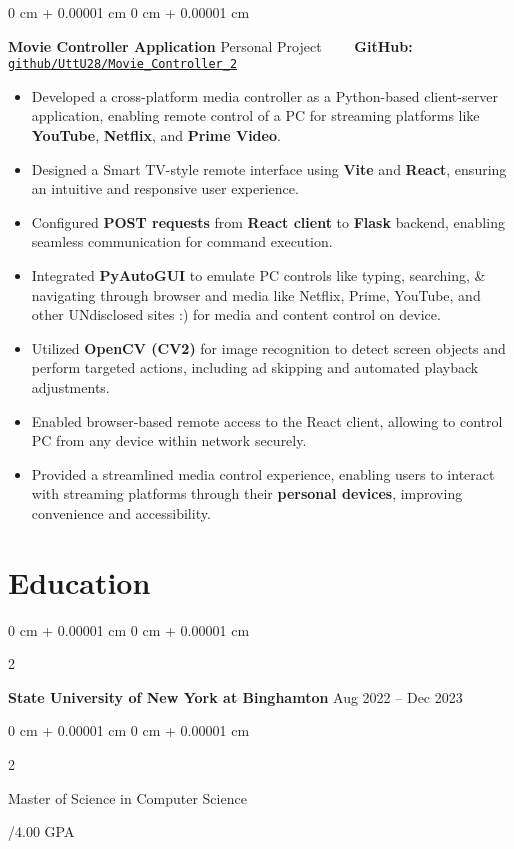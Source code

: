 \documentclass[10pt, letterpaper]{article}
\newenvironment{highlights}{
    \begin{itemize}[
        topsep=0.10 cm,
        parsep=0.10 cm,
        partopsep=0pt,
        itemsep=0pt,
        leftmargin=0 cm + 10pt
    ]
}{
    \end{itemize}
} %
\newenvironment{onecolentry}{
    \begin{adjustwidth}{
        0 cm + 0.00001 cm
    }{
        0 cm + 0.00001 cm
    }
}{
    \end{adjustwidth}
} %
\newenvironment{twocolentry}[2][]{
    \onecolentry
    \def\secondColumn{#2}
    \setcolumnwidth{\fill, 4.5 cm}
    \begin{paracol}{2}
}{
    \switchcolumn \raggedleft \secondColumn
    \end{paracol}
    \endonecolentry
} %
\begin{document}
\begin{onecolentry}
	\textbf{Movie Controller Application} \hfill Personal Project \ \ \ \ \textbf{GitHub:} \href{https://github.com/UttU28/Movie_Controller_2}{\texttt{github/UttU28/Movie\_Controller\_2}}
	\begin{highlights}
		\item Developed a cross-platform media controller as a Python-based client-server application, enabling remote control of a PC for streaming platforms like \textbf{YouTube}, \textbf{Netflix}, and \textbf{Prime Video}.
		\item Designed a Smart TV-style remote interface using \textbf{Vite} and \textbf{React}, ensuring an intuitive and responsive user experience.
		\item Configured \textbf{POST requests} from \textbf{React client} to \textbf{Flask} backend, enabling seamless communication for command execution.
		\item Integrated \textbf{PyAutoGUI} to emulate PC controls like typing, searching, \& navigating through browser and media like Netflix, Prime, YouTube, and other UNdisclosed sites :) for media and content control on device.
		\item Utilized \textbf{OpenCV (CV2)} for image recognition to detect screen objects and perform targeted actions, including ad skipping and automated playback adjustments.
		\item Enabled browser-based remote access to the React client, allowing to control PC from any device within network securely.
		\item Provided a streamlined media control experience, enabling users to interact with streaming platforms through their \textbf{personal devices}, improving convenience and accessibility.
	\end{highlights}
\end{onecolentry}



\section{Education}
\begin{twocolentry}{
		Aug 2022 – Dec 2023
	}
	\textbf{State University of New York at Binghamton}\end{twocolentry}

\begin{twocolentry}{
		3.44/4.00 GPA
	}
	Master of Science in Computer Science
\end{twocolentry}
\end{document}
